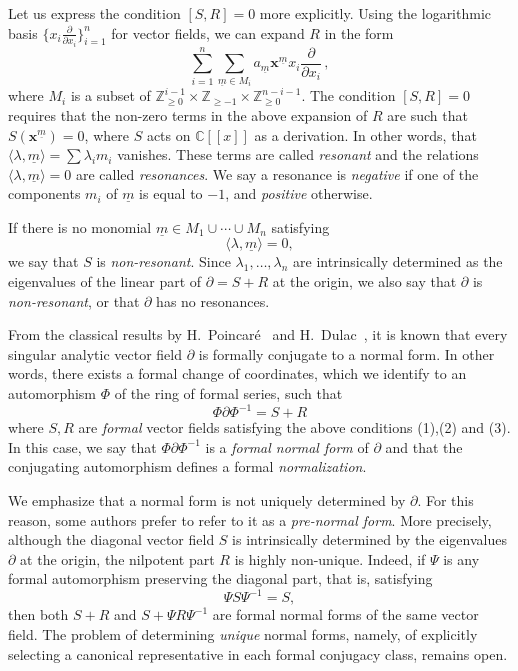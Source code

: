 \documentclass[10pt,twoside,reqno]{amsart}
\theoremstyle{remark}
\theoremstyle{remark}
\newcommand{\um}{{\underline m}}
\newcommand{\x}{\mathbf{x}}
\begin{document}
Let us express the condition $[S,R]=0$ more explicitly. Using the logarithmic basis $\{  x_i \frac{\partial}{\partial x_i}  \}_{i=1}^n$ for vector fields, we can expand 
$R$ in the form 
$$\sum_{i=1}^n \sum_{\um\in M_i } a_{\um}\x ^{\um}  x_i \frac{\partial}{\partial x_i} \, ,$$ where $M_i$ is a subset of $\mathbb{Z}_{\ge 0}^{i-1}\times \mathbb{Z}_{\ge -1} \times \mathbb{Z}_{\ge 0}^{n-i-1}$.
The condition $[S,R]=0$ requires that the non-zero terms in the above expansion of $R$ are such that
$S(\x^{\um})=0$, where $S$ acts on $\mathbb{C}[[x]]$ as a derivation. In other words, that $\langle \lambda, \um\rangle=\sum \lambda_i m_i$ vanishes. These terms are called \emph{resonant} and the relations $\langle \lambda, \um\rangle=0$ are called \emph{resonances}. We say a resonance is \emph{negative} if one of the components $m_{i}$ of $\um$ is equal to $-1$, and \emph{positive} otherwise.  

If there is no monomial $\um\in M_1\cup\cdots\cup M_n$ satisfying
\[
\langle\lambda,\um\rangle=0,
\]
we say that $S$ is \emph{non-resonant}. Since $\lambda_1,\ldots,\lambda_n$ are intrinsically determined as the eigenvalues of the linear part of $\partial=S+R$ at the origin, we also say that $\partial$ is \emph{non-resonant}, or that $\partial$ has no resonances. 


From the classical results by H.~Poincaré~\cite{Poincare1881} and H.~Dulac~\cite{Dulac1903}, it is known that every singular analytic vector field $\partial$ is formally conjugate to a normal form. In other words, there exists a formal change of coordinates, which we identify to an automorphism $\Phi$ of the ring of formal series, such that 
$$
\Phi \partial \Phi^{-1} = S + R
$$
where $S,R$ are {\em formal} vector fields satisfying the above conditions (1),(2) and (3). In this case, we say that $\Phi \partial \Phi^{-1}$ is a {\em formal normal form} of $\partial$ and that the conjugating automorphism defines a formal {\em normalization}.  

We emphasize that a normal form is not uniquely determined by $\partial$. For this reason, some authors prefer to refer to it as a {\em pre-normal form}. More precisely, although the diagonal vector field $S$ is intrinsically determined by the eigenvalues $\partial$ at the origin, the nilpotent part $R$ is highly non-unique. Indeed, if $\Psi$ is any formal automorphism preserving the diagonal part, that is, satisfying
$$\Psi S \Psi^{-1}=S,$$
then both $S+R$ and $S+\Psi R\Psi^{-1}$ are formal normal forms of the same vector field. The problem of determining {\em unique} normal forms, namely, of explicitly selecting a canonical representative in each formal conjugacy class, remains open.
\end{document}
